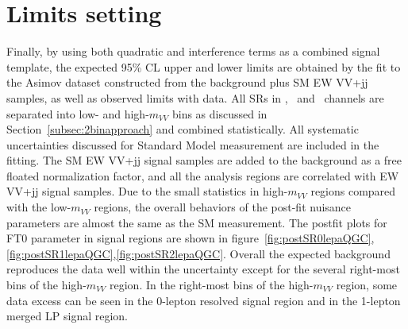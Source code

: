 \section{Limits setting}
Finally, by using both quadratic and interference terms as a combined signal template, the expected 95\% CL upper and lower limits are obtained by the fit to the Asimov dataset constructed from the background plus SM EW VV+jj samples, as well as observed limits with data.
All SRs in \zlep, \olep\, and \tlep\ channels are separated into low- and high-$m_{VV}$ bins as discussed in Section~\ref{subsec:2binapproach} and combined statistically.
All systematic uncertainties discussed for Standard Model measurement are included in the fitting.
The SM EW VV+jj signal samples are added to the background as a free floated normalization factor, and all the analysis regions are correlated with EW VV+jj signal samples.
Due to the small statistics in high-$m_{VV}$ regions compared with the low-$m_{VV}$ regions, the overall behaviors of the post-fit nuisance parameters are almost the same as the SM measurement.
The postfit plots for FT0 parameter in signal regions are shown in figure~\ref{fig:postSR0lepaQGC}, \ref{fig:postSR1lepaQGC},\ref{fig:postSR2lepaQGC}. 
Overall the expected background reproduces the data well within the uncertainty except for the several right-most bins of the high-$m_{VV}$ region.
In the right-most bins of the high-$m_{VV}$ region, some data excess can be seen in the 0-lepton resolved signal region and in the 1-lepton merged LP signal region.

